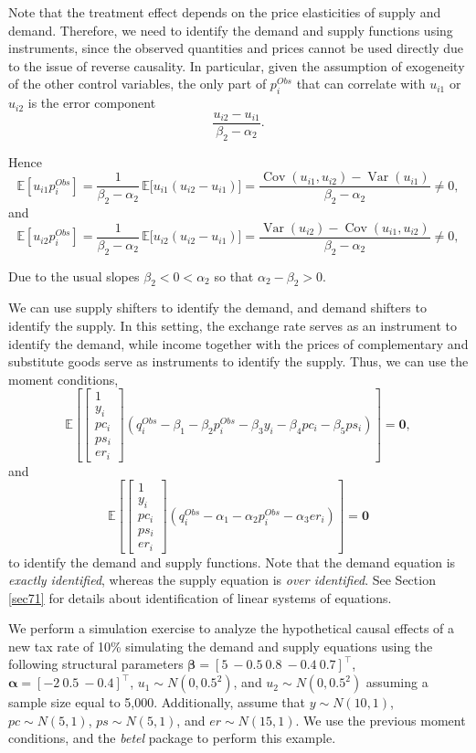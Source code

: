 Note that the treatment effect depends on the price elasticities of supply and demand. Therefore, we need to identify the demand and supply functions using instruments, since the observed quantities and prices cannot be used directly due to the issue of reverse causality. In particular, given the assumption of exogeneity of the other control variables, the only part of $p_i^{Obs}$ that can correlate with $u_{i1}$ or $u_{i2}$ is the error component
\[
\frac{u_{i2}-u_{i1}}{\beta_2-\alpha_2}.
\]

Hence
\[
\mathbb{E}[u_{i1}p_i^{Obs}]
=\frac{1}{\beta_2-\alpha_2}\,\mathbb{E}\!\big[u_{i1}(u_{i2}-u_{i1})\big]
=\frac{\operatorname{Cov}(u_{i1},u_{i2})-\operatorname{Var}(u_{i1})}{\beta_2-\alpha_2}\neq 0,
\]
and
\[
\mathbb{E}[u_{i2}p_i^{Obs}]
=\frac{1}{\beta_2-\alpha_2}\,\mathbb{E}\!\big[u_{i2}(u_{i2}-u_{i1})\big]
=\frac{\operatorname{Var}(u_{i2})-\operatorname{Cov}(u_{i1},u_{i2})}{\beta_2-\alpha_2}\neq 0,
\]

Due to the usual slopes $\beta_2<0<\alpha_2$ so that $\alpha_2-\beta_2>0$.

We can use supply shifters to identify the demand, and demand shifters to identify the supply. In this setting, the exchange rate serves as an instrument to identify the demand, while income together with the prices of complementary and substitute goods serve as instruments to identify the supply. Thus, we can use the moment conditions,
\[
\mathbb{E}\left[\begin{bmatrix}
	1\\
	y_i\\
	pc_i\\
	ps_i\\
	er_i
\end{bmatrix}(q_i^{Obs}-\beta_1-\beta_2p_i^{Obs}-\beta_3y_i-\beta_4pc_i-\beta_5ps_i)\right]=\mathbf{0},
\] 
and 
\[
\mathbb{E}\left[\begin{bmatrix}
	1\\
	y_i\\
	pc_i\\
	ps_i\\
	er_i
\end{bmatrix}(q_i^{Obs}-\alpha_1-\alpha_2p_i^{Obs}-\alpha_3er_i)\right]=\mathbf{0}
\]
to identify the demand and supply functions. Note that the demand equation is \textit{exactly identified}, whereas the supply equation is \textit{over identified}. See Section \ref{sec71} for details about identification of linear systems of equations.

We perform a simulation exercise to analyze the hypothetical causal effects of a new tax rate of 10\% simulating the demand and supply equations using the following structural parameters $\bm{\beta} = \left[ 5 \ -0.5 \ 0.8 \ -0.4 \ 0.7 \right]^{\top}$, $\bm{\alpha} = \left[ -2 \ 0.5 \ -0.4 \right]^{\top}$, $u_1 \sim N(0, 0.5^2)$, and $u_2 \sim N(0, 0.5^2)$ assuming a sample size equal to 5,000. Additionally, assume that $y \sim N(10, 1)$, $pc \sim N(5, 1)$, $ps \sim N(5, 1)$, and $er \sim N(15, 1)$. We use the previous moment conditions, and the \textit{betel} package to perform this example.


